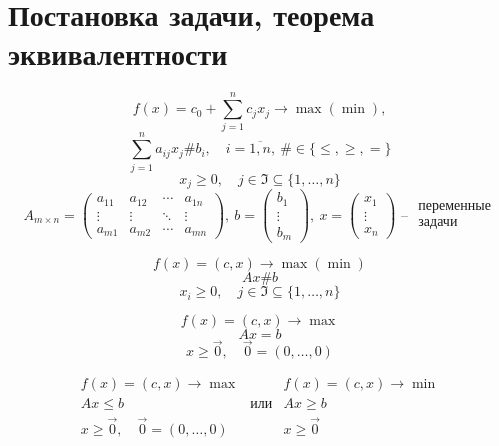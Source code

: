 \section{Постановка задачи, теорема эквивалентности}

\begin{definition}
    \[
        f(x) = c_0 + \sum_{j=1}^{n}c_jx_j \longrightarrow \max(\min),
    \]
    \[
        \sum_{j=1}^{n}a_{ij}x_j \# b_i, \quad i = \overline{1,n}, \ \# \in \{\leqslant,\geqslant,=\}
    \]
    \[
        x_j \geqslant 0, \quad j \in \mathfrak{I} \subseteq \{1,\ldots,n\}
    \]
    \[
        A_{m\times n} = \left(\begin{matrix}
                a_{11} & a_{12} & \cdots & a_{1n} \\
                \vdots & \vdots & \ddots & \vdots \\
                a_{m1} & a_{m2} & \cdots & a_{mn}
            \end{matrix}\right), \ b = \left(\begin{matrix}
                b_1 \\ \vdots \\ b_m
            \end{matrix}\right), \ x = \left(\begin{matrix}
                x_1 \\ \vdots \\ x_n
            \end{matrix}\right) \text{ -- }\begin{array}{ll}
            \text{переменные} \\ \text{задачи}
        \end{array}
    \]
\end{definition}

\begin{note}
    \[
        f(x) = (c,x) \longrightarrow \max(\min)
    \]
    \[
        Ax \# b
    \]
    \[
        x_i \geqslant 0, \quad j \in \mathfrak{I} \subseteq \{1,\ldots,n\}
    \]
\end{note}

\begin{note}
    \[
        f(x) = (c,x) \longrightarrow \max
    \]
    \[
        Ax = b
    \]
    \[
        x \geqslant \vec{0}, \quad \vec{0} = (0,\ldots,0)
    \]
\end{note}

\begin{note}
    \[
        \begin{array}{ccc}
            f(x) = (c,x) \longrightarrow \max                 &            & f(x) = (c,x)\longrightarrow \min \\
            Ax \leqslant b                                    & \text{или} & Ax \geqslant b                   \\
            x \geqslant \vec{0}, \quad \vec{0} = (0,\ldots,0) &            & x \geqslant \vec{0}
        \end{array}
    \]
\end{note}

